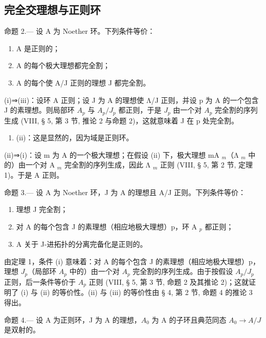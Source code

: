 \subsection{完全交理想与正则环}

命题 2.--- 设 A 为 Noether 环。下列条件等价：

\begin{enumerate}
\def\labelenumi{(\roman{enumi})}
\item
  A 是正则的；
\item
  A 的每个极大理想都完全割；
\item
  A 的每个使 A/J 正则的理想 J 都完全割。
\end{enumerate}

(i)⇒(iii)：设环 A 正则；设 J 为 A 的理想使 Λ/J 正则，并设 p 为 A 的一个包含 J 的素理想。则局部环 \(A_{p}\) 与 \(A_{p}/J_{p}\) 都正则，于是 \(J_{p}\) 由一个对 \(A_{p}\) 完全割的序列生成 (VIII, § 5, 第 3 节, 推论 2 与命题 2)，这就意味着 J 在 p 处完全割。

\begin{enumerate}
\def\labelenumi{(\roman{enumi})}
\setcounter{enumi}{2}
\tightlist
\item
  (ii)：这是显然的，因为域是正则环。
\end{enumerate}

(ii)⇒(i)：设 m 为 A 的一个极大理想；在假设 (ii) 下，极大理想 mA \(_{m}\)（Λ \(_{m}\) 中的）由一个对 A \(_{m}\) 完全割的序列生成，因此 Λ \(_{m}\) 正则 (VIII, § 5, 第 2 节, 定理 1)。于是 A 正则。

命题 3.--- 设 A 为 Noether 环，J 为 A 的理想且 A/J 正则。下列条件等价：

\begin{enumerate}
\def\labelenumi{(\roman{enumi})}
\item
  理想 J 完全割；
\item
  对 A 的每个包含 J 的素理想（相应地极大理想）p，环 A \(_{p}\) 都正则；
\item
  A 关于 J-进拓扑的分离完备化是正则的。
\end{enumerate}

由定理 1，条件 (i) 意味着：对 A 的每个包含 J 的素理想（相应地极大理想）p，理想 \(J_{p}\)（局部环 \(A_{p}\) 中的）由一个对 \(A_{p}\) 完全割的序列生成。由于按假设 \(A_{p}/J_{p}\) 正则，后一条件等价于 \(A_{p}\) 正则 (VIII, § 5, 第 3 节, 命题 2 及其推论 2)；这就证明了 (i) 与 (ii) 的等价性。(ii) 与 (iii) 的等价性由 § 4, 第 2 节, 命题 4 的推论 3 得出。

命题 4.--- 设 A 为正则环，J 为 A 的理想，\(A_{0}\) 为 A 的子环且典范同态 \(A_{0} \rightarrow A/J\) 是双射的。

